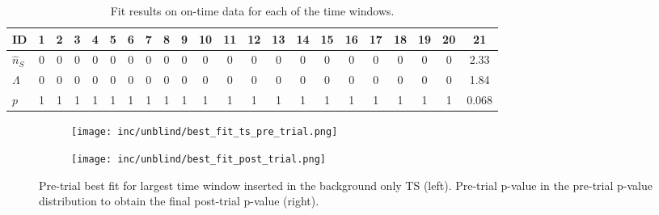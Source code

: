 \begin{table}[htbp]
  \caption{Fit results on on-time data for each of the time windows.}
  \begin{tabular}{l|ccccccccccccccccccccc}
  \toprule
  ID & 1 & 2 & 3 & 4 & 5 & 6 & 7 & 8 & 9 & 10 & 11 & 12 & 13 & 14 & 15 & 16 & 17 & 18 & 19 & 20 & 21 \\
  \midrule
  $\hat{n}_S$ & 0 & 0 & 0 & 0 & 0 & 0 & 0 & 0 & 0 & 0 & 0 & 0 & 0 & 0 & 0 & 0 & 0 & 0 & 0 & 0 & 2.33 \\
  $\Lambda$ & 0 & 0 & 0 & 0 & 0 & 0 & 0 & 0 & 0 & 0 & 0 & 0 & 0 & 0 & 0 & 0 & 0 & 0 & 0 & 0 & 1.84 \\
  $p$ & 1 & 1 & 1 & 1 & 1 & 1 & 1 & 1 & 1 & 1 & 1 & 1 & 1 & 1 & 1 & 1 & 1 & 1 & 1 & 1 & 0.068 \\
  \bottomrule
  \end{tabular}
  \label{tab:unblinded}
\end{table}

\begin{figure}[htbp]
  \centering
  \begin{subfigure}[c]{0.45\textwidth}
    \texttt{[image: inc/unblind/best\_fit\_ts\_pre\_trial.png]}
  \end{subfigure}
  \hfill
  \begin{subfigure}[c]{0.45\textwidth}
    \texttt{[image: inc/unblind/best\_fit\_post\_trial.png]}
  \end{subfigure}
  \caption{Pre-trial best fit for largest time window inserted in the background only TS (left). Pre-trial p-value in the pre-trial p-value distribution to obtain the final post-trial p-value (right).}
  \label{fig:unblinded}
\end{figure}


\appendix
\part*{\appendixname}
